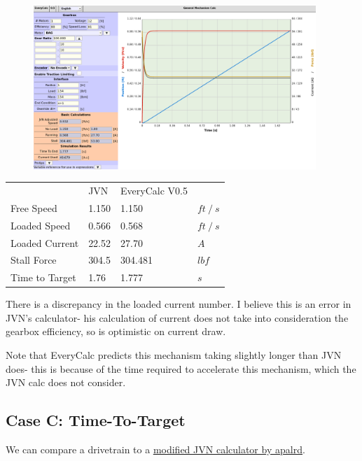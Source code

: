 \documentclass[10pt,letterpaper]{article}
\begin{document}
	\begin{figure}[H]
		\includegraphics[width=0.95\textwidth]{validation/mechanism_EC_B.png}
	\end{figure}

	\begin{table}[H]
	\begin{tabular}{llll}
	                & JVN & EveryCalc V0.5 & \\ \cline{1-4} 
	Free Speed      & 1.150 & 1.150 & $ft \ / \ s$ \\
	Loaded Speed    & 0.566 & 0.568 & $ft \ / \ s$ \\
	Loaded Current  & 22.52 & 27.70 & $A$ \\
	Stall Force     & 304.5 & 304.481 & $lbf$ \\
	Time to Target  & 1.76  & 1.777 & $s$
	\end{tabular}
	\end{table}

	There is a discrepancy in the loaded current number. I believe this is an error in JVN's calculator- his calculation of current does not take into consideration the gearbox efficiency, so is optimistic on current draw.

	Note that EveryCalc predicts this mechanism taking slightly longer than JVN does- this is because of the time required to accelerate this mechanism, which the JVN calc does not consider.

	\newpage
	\subsection*{Case C: Time-To-Target}
	We can compare a drivetrain to a \href{https://www.chiefdelphi.com/t/paper-jvn-calc-apalrds-time-to-distance/146546}{\underline{modified JVN calculator by apalrd}}.
\end{document}
